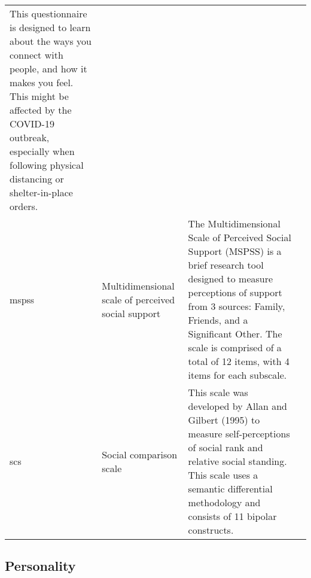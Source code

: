 \documentclass[]{book}
\begin{document}
\begin{longtable}[]{@{}llll@{}}
\begin{minipage}[t]{0.22\columnwidth}
This questionnaire is designed to learn about the ways you connect with people, and how it makes you feel. This might be affected by the COVID-19 outbreak, especially when following physical distancing or shelter-in-place orders.\strut
\end{minipage} & \begin{minipage}[t]{0.18\columnwidth}\raggedright
\strut
\end{minipage}\tabularnewline
\begin{minipage}[t]{0.22\columnwidth}\raggedright
mspss\strut
\end{minipage} & \begin{minipage}[t]{0.27\columnwidth}\raggedright
Multidimensional scale of perceived social support\strut
\end{minipage} & \begin{minipage}[t]{0.22\columnwidth}\raggedright
The Multidimensional Scale of Perceived Social Support (MSPSS) is a brief research tool designed to measure perceptions of support from 3 sources: Family, Friends, and a Significant Other. The scale is comprised of a total of 12 items, with 4 items for each subscale.\strut
\end{minipage} & \begin{minipage}[t]{0.18\columnwidth}\raggedright
\strut
\end{minipage}\tabularnewline
\begin{minipage}[t]{0.22\columnwidth}\raggedright
scs\strut
\end{minipage} & \begin{minipage}[t]{0.27\columnwidth}\raggedright
Social comparison scale\strut
\end{minipage} & \begin{minipage}[t]{0.22\columnwidth}\raggedright
This scale was developed by Allan and Gilbert (1995) to measure self-perceptions of social rank and relative social standing. This scale uses a semantic differential methodology and consists of 11 bipolar constructs.\strut
\end{minipage} & \begin{minipage}[t]{0.18\columnwidth}\raggedright
\strut
\end{minipage}\tabularnewline
\bottomrule
\end{longtable}

\hypertarget{personality}{%
\subsection{Personality}\label{personality}}
\end{document}
